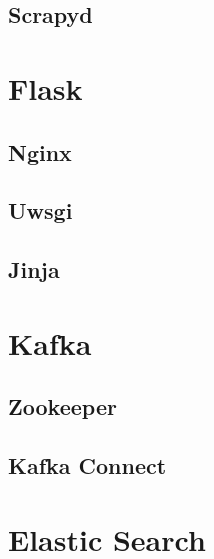 \subsection{Scrapyd}
\section{Flask}
\subsection{Nginx}
\subsection{Uwsgi}
\subsection{Jinja}
\section{Kafka}
\subsection{Zookeeper}
\subsection{Kafka Connect}
\section{Elastic Search}
